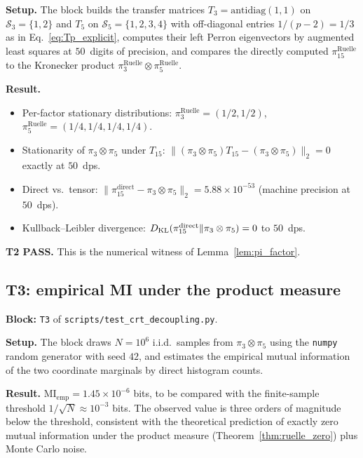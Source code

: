 \textbf{Setup.} The block builds the transfer matrices
$T_3 = \mathrm{antidiag}(1, 1)$ on $\mathcal{S}_3 = \{1, 2\}$ and
$T_5$ on $\mathcal{S}_5 = \{1, 2, 3, 4\}$ with off-diagonal
entries $1/(p-2) = 1/3$ as in Eq.~\eqref{eq:Tp_explicit}, computes
their left Perron eigenvectors by augmented least squares at
$50$~digits of precision, and compares the directly computed
$\pi_{15}^{\mathrm{Ruelle}}$ to the Kronecker product
$\pi_3^{\mathrm{Ruelle}} \otimes \pi_5^{\mathrm{Ruelle}}$.

\textbf{Result.}
\begin{itemize}[itemsep=2pt,leftmargin=*]
  \item Per-factor stationary distributions:
    $\pi_3^{\mathrm{Ruelle}} = (1/2, 1/2)$,
    $\pi_5^{\mathrm{Ruelle}} = (1/4, 1/4, 1/4, 1/4)$.
  \item Stationarity of $\pi_3 \otimes \pi_5$ under $T_{15}$:
    $\|(\pi_3 \otimes \pi_5) T_{15} - (\pi_3 \otimes \pi_5)\|_2
    = 0$ exactly at $50$~dps.
  \item Direct vs.\ tensor:
    $\|\pi_{15}^{\mathrm{direct}} - \pi_3 \otimes \pi_5\|_2 =
    5.88 \times 10^{-53}$ (machine precision at $50$~dps).
  \item Kullback--Leibler divergence:
    $D_{\mathrm{KL}}(\pi_{15}^{\mathrm{direct}} \| \pi_3 \otimes \pi_5) =
    0$ to $50$~dps.
\end{itemize}

\textbf{T2 PASS.} This is the numerical witness of
Lemma~\ref{lem:pi_factor}.

\subsection{T3: empirical MI under the product measure}
\label{appssec:T3}

\textbf{Block:} \texttt{T3} of \texttt{scripts/test\_crt\_decoupling.py}.

\textbf{Setup.} The block draws $N = 10^6$ i.i.d.\ samples from
$\pi_3 \otimes \pi_5$ using the \texttt{numpy} random generator
with seed $42$, and estimates the empirical mutual
information of the two coordinate marginals by direct histogram
counts.

\textbf{Result.}
$\mathrm{MI}_{\mathrm{emp}} = 1.45 \times 10^{-6}$ bits,
to be compared with the finite-sample threshold
$1/\sqrt{N} \approx 10^{-3}$ bits. The observed value is three
orders of magnitude below the threshold, consistent with the
theoretical prediction of exactly zero mutual information under
the product measure (Theorem~\ref{thm:ruelle_zero}) plus Monte
Carlo noise.

